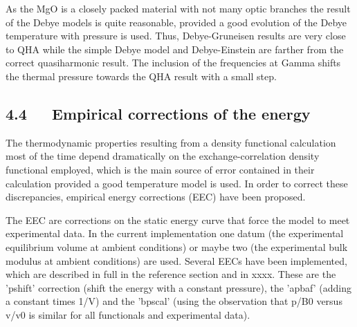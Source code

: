 \documentclass[a4paper]{article}
\begin{document}
As the MgO is a closely packed material with not many optic branches
the result of the Debye models is quite reasonable, provided a good
evolution of the Debye temperature with pressure is used. Thus,
Debye-Gruneisen results are very close to QHA while the simple Debye
model and Debye-Einstein are farther from the correct quasiharmonic
result. The inclusion of the frequencies at Gamma shifts the thermal
pressure towards the QHA result with a small step.


\subsection{4.4~~~Empirical corrections of the energy%
  \label{empirical-corrections-of-the-energy}%
}

The thermodynamic properties resulting from a density functional
calculation most of the time depend dramatically on the
exchange-correlation density functional employed, which is the main
source of error contained in their calculation provided a good
temperature model is used. In order to correct these discrepancies,
empirical energy corrections (EEC) have been proposed.

The EEC are corrections on the static energy curve that force the
model to meet experimental data. In the current implementation one
datum (the experimental equilibrium volume at ambient conditions) or
maybe two (the experimental bulk modulus at ambient conditions) are
used. Several EECs have been implemented, which are described in full
in the reference section and in xxxx. These are the 'pshift'
correction (shift the energy with a constant pressure), the 'apbaf'
(adding a constant times 1/V) and the 'bpscal' (using the observation
that p/B0 versus v/v0 is similar for all functionals and experimental
data).
\end{document}
